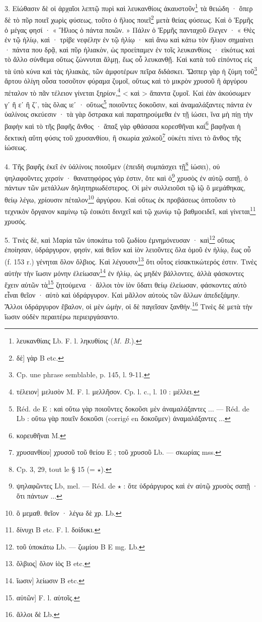 \documentclass[landscape, a4paper, 11pt, oneside, polutonikogreek, french]{article}
\begin{document}
3. Εἰώθασιν δὲ οἱ ἀρχαῖοι λεπτῷ πυρὶ καὶ λευκανθίοις ἀκαυστοῦν\footnote{λευκανθίαις Lb. F. l. ληκυθίοις (\emph{M. B.}).} τὰ θειώδη · ὅπερ δὲ τὸ πῦρ ποιεῖ χωρὶς φύσεως, τοῦτο ὁ ἥλιος ποιεῖ\footnote{δὲ] γὰρ B etc.} μετὰ θείας φύσεως. Καὶ ὁ Ἑρμῆς ὁ μέγας φησί · « Ἥλιος ὁ πάντα ποιῶν. » Πάλιν ὁ Ἑρμῆς πανταχοῦ ἔλεγεν · « Θὲς ἐν τῷ ἡλίῳ, καὶ · τρίβε νεφέλην ἐν τῷ ἡλίῳ · καὶ ἄνω καὶ κάτω τὸν ἥλιον σημαίνει · πάντα που δρᾷ, καὶ πῦρ ἡλιακὸν, ὡς προείπαμεν ἐν τοῖς λευκανθίοις · εἰκότως καὶ τὸ ἄλλο σύνθεμα οὕτως ζώννυται ἅλμῃ, ἕως οὗ λευκανθῇ. Καὶ κατὰ τοῦ εἰπόντος εἰς τὰ ὑπὸ κύνα καὶ τὰς ἡλιακὰς, τῶν ἀμφοτέρων πεῖρα διδάσκει. Ὥσπερ γὰρ ἡ ζύμη τοῦ\footnote{Cp. une phrase semblable, p. 145, l. 9-11.} ἄρτου ὀλίγη οὖσα τοσοῦτον φύραμα ζυμοῖ, οὕτως καὶ τὸ μικρὸν χρυσοῦ ἢ ἀργύρου πέταλον τὸ πᾶν τέλειον γίνεται ξηρίον,\footnote{τέλειον] μελισὸν M. F. l. μελλῆσον. Cp. l. c., l. 10 : μέλλει.} < καὶ > ἅπαντα ζυμοῖ. Καὶ ἐὰν ἀκούσωμεν γʹ ἢ εʹ ἢ ζʹ, τὰς ὅλας ιεʹ · οὕτως\footnote{Réd. de E : καὶ οὕτω γὰρ ποιοῦντες δοκοῦσι μὲν ἀναμαλάξαντες ... --- Réd. de Lb : οὕτω γὰρ ποιεῖν δοκοῦσι (corrigé en δοκοῦμεν) ἀναμαλάξαντες ...} ποιοῦντες δοκοῦσιν, καὶ ἀναμαλάξαντες πάντα ἐν ὑαλίνοις σκεύεσιν · τὰ γὰρ ὄστρακα καὶ παρατηρούμεθα ἐν τῇ ἰώσει, ἵνα μὴ πίῃ τὴν βαφὴν καὶ τὸ τῆς βαφῆς ἄνθος · ἅπαξ γὰρ φθάσασα κορεσθῆναι καὶ\footnote{κορευθῆναι M.} βαφῆναι ἡ δεκτικὴ αὕτη φύσις τοῦ χρυσανθίου, ἢ σκωρία χαλκοῦ\footnote{χρυσανθίου] χρυσοῦ τοῦ θείου E ; τοῦ χρυσοῦ Lb. --- σκωρίας mss.} οὐκέτι πίνει τὸ ἄνθος τῆς ἰώσεως.

4. Τῆς βαφῆς ἐκεῖ ἐν ὑάλίνοις ποιοῦμεν (ἐπειδὴ συμπάσχει τῇ\footnote{Cp. 3, 29, tout le § 15 (= $\star$).} ἰώσει), οὐ ψηλαφοῦντες χερσίν · θανατηφόρος γάρ ἐστιν, ὅτε καὶ ὁ\footnote{ψηλαφῶντες Lb, mel. --- Réd. de $\star$ : ὅτε ὑδράργυρος καὶ ἐν αὐτῷ χρυσὸς σαπῇ · ὅτι πάντων ...} χρυσὸς ἐν αὐτῷ σαπῇ, ὁ πάντων τῶν μετάλλων δηλητηριωδέστερος. Οἱ μὲν συλλειοῦσι τῷ ἰῷ ὃ μεμάθηκας, θείῳ λέγω, χρίουσιν πέταλον\footnote{ὃ μεμαθ. θεῖον · λέγω δὲ χρ. Lb.} ἀργύρου. Καὶ οὕτως ἐκ προβάσεως ὀπτοῦσιν τὸ τεχνικὸν ὄργανον καμίνῳ τῷ ἐοικότι δινιχεῖ καὶ τῷ χωνίῳ τῷ βαθμοειδεῖ, καὶ γίνεται\footnote{δίνυχι B etc. F. l. δοίδυκι.} χρυσός.

5. Τινὲς δὲ, καὶ Μαρία τῶν ὑποκάτω τοῦ ζωδίου ἐμνημόνευσαν · καὶ\footnote{τοῦ ὑποκάτω Lb. --- ζωμίου B E mg. Lb.} οὕτως ἐποίησαν, ὑδράργυρον, φησὶν, καὶ θεῖον καὶ ἰὸν λειοῦντες ὅλα ὁμοῦ ἐν ἡλίῳ, ἕως οὗ (f. 153 r.) γένηται ὅλον ὄλβιος. Καὶ λέγουσιν\footnote{ὄλβιος] ὅλον ἰὸς B etc.} ὅτι οὗτος εἰσακτικώτερός ἐστιν. Τινὲς αὐτὴν τὴν ἴωσιν μόνην ἐλείωσαν\footnote{ἴωσιν] λείωσιν B etc.} ἐν ἡλίῳ, ὡς μηδὲν βάλλοντες, ἀλλὰ φάσκοντες ἔχειν αὐτῶν τὰ\footnote{αὐτῶν] F. l. αὐτοῖς.} ζητούμενα · ἄλλοι τὸν ἰὸν ὕδατι θείῳ ἐλείωσαν, φάσκοντες αὐτὸ εἶναι θεῖον · αὐτὸ καὶ ὑδράργυρον. Καὶ μᾶλλον αὐτοὺς τῶν ἄλλων ἀπεδεξάμην. Ἄλλοι ὑδράργυρον ἔβαλον, οἱ μὲν ὠμὴν, οἱ δὲ παγεῖσαν ξανθήν.\footnote{ἄλλοι δὲ Lb.} Τινὲς δὲ μετὰ τὴν ἴωσιν οὐδὲν περαιτέρω περιειργάσαντο.
\end{document}
